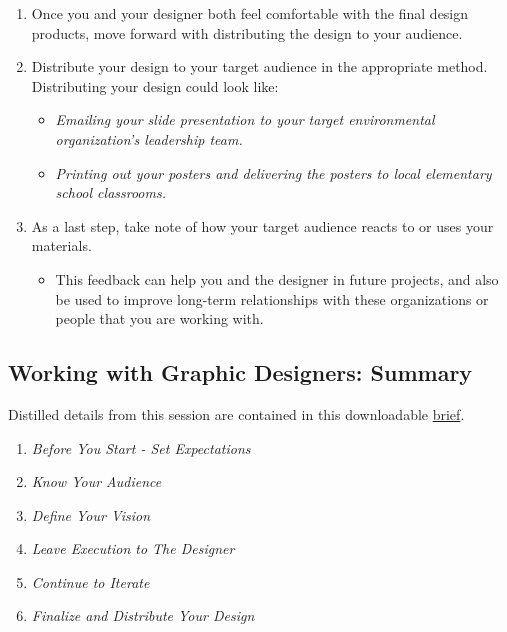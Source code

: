 \documentclass[
]{book}
\providecommand{\tightlist}{%
  \setlength{\itemsep}{0pt}\setlength{\parskip}{0pt}}
\begin{document}
\begin{enumerate}
\def\labelenumi{\arabic{enumi}.}
\tightlist
\item
  Once you and your designer both feel comfortable with the final design products, move forward with distributing the design to your audience.
\item
  Distribute your design to your target audience in the appropriate method. Distributing your design could look like:

  \begin{itemize}
  \tightlist
  \item
    \emph{Emailing your slide presentation to your target environmental organization's leadership team.}
  \item
    \emph{Printing out your posters and delivering the posters to local elementary school classrooms.}
  \end{itemize}
\item
  As a last step, take note of how your target audience reacts to or uses your materials.

  \begin{itemize}
  \tightlist
  \item
    This feedback can help you and the designer in future projects, and also be used to improve long-term relationships with these organizations or people that you are working with.
  \end{itemize}
\end{enumerate}

\hypertarget{working-with-graphic-designers-summary}{%
\subsection{Working with Graphic Designers: Summary}\label{working-with-graphic-designers-summary}}

Distilled details from this session are contained in this downloadable \href{files/M4S3_Working_With_Graphic_Designers_Brief.pdf}{brief}.

\begin{enumerate}
\def\labelenumi{\arabic{enumi}.}
\tightlist
\item
  \emph{Before You Start - Set Expectations}
\item
  \emph{Know Your Audience}
\item
  \emph{Define Your Vision}
\item
  \emph{Leave Execution to The Designer}
\item
  \emph{Continue to Iterate}
\item
  \emph{Finalize and Distribute Your Design}
\end{enumerate}
\end{document}
